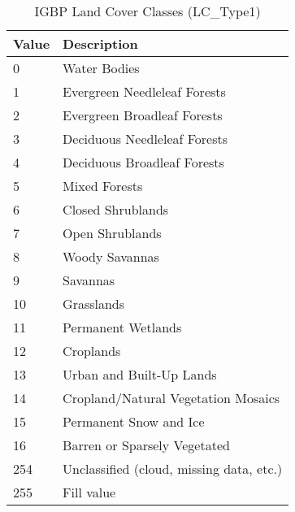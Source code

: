 \begin{table}[htbp]
	\centering
	\caption[IGBP Land Cover Classes]{IGBP Land Cover Classes (LC\_Type1)}
	\label{tab:igbp_classes}
	\begin{tabular}{ll}
		\toprule
		\textbf{Value} & \textbf{Description}                     \\
		\midrule
		0              & Water Bodies                             \\
		1              & Evergreen Needleleaf Forests             \\
		2              & Evergreen Broadleaf Forests              \\
		3              & Deciduous Needleleaf Forests             \\
		4              & Deciduous Broadleaf Forests              \\
		5              & Mixed Forests                            \\
		6              & Closed Shrublands                        \\
		7              & Open Shrublands                          \\
		8              & Woody Savannas                           \\
		9              & Savannas                                 \\
		10             & Grasslands                               \\
		11             & Permanent Wetlands                       \\
		12             & Croplands                                \\
		13             & Urban and Built-Up Lands                 \\
		14             & Cropland/Natural Vegetation Mosaics      \\
		15             & Permanent Snow and Ice                   \\
		16             & Barren or Sparsely Vegetated             \\
		254            & Unclassified (cloud, missing data, etc.) \\
		255            & Fill value                               \\
		\bottomrule
	\end{tabular}
\end{table}

